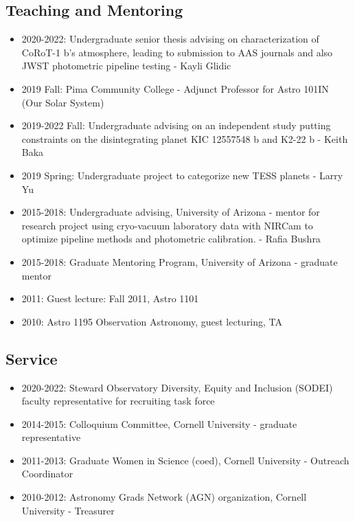 \documentclass[11pt, oneside]{article}   	%
\begin{document}
\subsection*{Teaching and Mentoring}
\begin{itemize}[noitemsep]
    \item 2020-2022: Undergraduate senior thesis advising on characterization of CoRoT-1 b's atmosphere, leading to submission to AAS journals and also JWST photometric pipeline testing - Kayli Glidic
    \item 2019 Fall: Pima Community College - Adjunct Professor for Astro 101IN (Our Solar System)
    \item 2019-2022 Fall: Undergraduate advising on an independent study putting constraints on the disintegrating planet KIC 12557548 b and K2-22 b - Keith Baka
    \item 2019 Spring: Undergraduate project to categorize new TESS planets - Larry Yu
    \item 2015-2018: Undergraduate advising, University of Arizona - mentor for research project using cryo-vacuum laboratory data with NIRCam to optimize pipeline methods and photometric calibration. - Rafia Bushra
    \item 2015-2018: Graduate Mentoring Program, University of Arizona - graduate mentor
    \item 2011: Guest lecture: Fall 2011, Astro 1101
    \item 2010: Astro 1195 Observation Astronomy, guest lecturing, TA
\end{itemize}

\subsection*{Service}
\begin{itemize}[noitemsep]
    \item 2020-2022: Steward Observatory Diversity, Equity and Inclusion (SODEI) faculty representative for recruiting task force
    \item 2014-2015: Colloquium Committee, Cornell University - graduate representative
    \item 2011-2013: Graduate Women in Science (coed), Cornell University - Outreach Coordinator
    \item2010-2012: Astronomy Grads Network (AGN) organization, Cornell University - Treasurer
\end{itemize}


\end{document}
